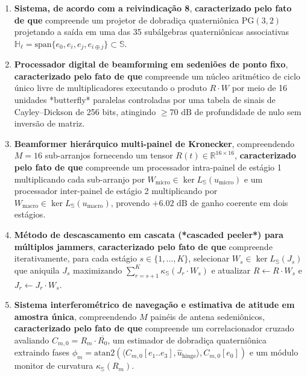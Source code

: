 \documentclass[12pt,a4paper]{article}
\begin{document}
\begin{enumerate}[leftmargin=20pt,itemsep=4pt]
    \item \textbf{Sistema, de acordo com a reivindica\c{c}\~ao 8}, \textbf{caracterizado pelo fato de que} compreende um projetor de dobradi\c{c}a quaterni\^onica $\mathrm{PG}(3,2)$ projetando a sa\'ida em uma das 35 sub\'algebras quaterni\^onicas associativas $\mathbb{H}_{\ell} = \mathrm{span}\{e_0, e_i, e_j, e_{i\oplus j}\} \subset \mathbb{S}$.

    \item \textbf{Processador digital de beamforming em sedeni\~oes de ponto fixo}, \textbf{caracterizado pelo fato de que} compreende um n\'ucleo aritm\'etico de ciclo \'unico livre de multiplicadores executando o produto $R \cdot W$ por meio de 16 unidades *butterfly* paralelas controladas por uma tabela de sinais de Cayley--Dickson de 256 bits, atingindo $\ge 70\text{ dB}$ de profundidade de nulo sem invers\~ao de matriz.

    \item \textbf{Beamformer hier\'arquico multi-painel de Kronecker}, compreendendo $M=16$ sub-arranjos fornecendo um tensor $R(t) \in \mathbb{R}^{16 \times 16}$, \textbf{caracterizado pelo fato de que} compreende um processador intra-painel de est\'agio 1 multiplicando cada sub-arranjo por $W_{\mathrm{micro}} \in \ker L_{\mathbb{S}}(u_{\mathrm{micro}})$ e um processador inter-painel de est\'agio 2 multiplicando por $W_{\mathrm{macro}} \in \ker L_{\mathbb{S}}(u_{\mathrm{macro}})$, provendo $+6.02\text{ dB}$ de ganho coerente em dois est\'agios.

    \item \textbf{M\'etodo de descascamento em cascata (*cascaded peeler*) para m\'ultiplos jammers}, \textbf{caracterizado pelo fato de que} compreende iterativamente, para cada est\'agio $s \in \{1,\dots,K\}$, selecionar $W_s \in \ker L_{\mathbb{S}}(J_s)$ que aniquila $J_s$ maximizando $\sum_{r=s+1}^K \kappa_{\mathbb{S}}(J_r \cdot W_s)$ e atualizar $R \leftarrow R \cdot W_s$ e $J_r \leftarrow J_r \cdot W_s$.

    \item \textbf{Sistema interferom\'etrico de navega\c{c}\~ao e estimativa de atitude em amostra \'unica}, compreendendo $M$ pain\'eis de antena sedeni\^onicos, \textbf{caracterizado pelo fato de que} compreende um correlacionador cruzado avaliando $C_{m,0} = R_m \cdot \overline{R_0}$, um estimador de dobradi\c{c}a quaterni\^onica extraindo fases $\phi_m = \mathrm{atan2}(\langle C_{m,0}[e_1..e_3], \hat{u}_{\mathrm{hinge}}\rangle, C_{m,0}[e_0])$ e um m\'odulo monitor de curvatura $\kappa_{\mathbb{S}}(R_m)$.


\end{enumerate}
\end{document}
